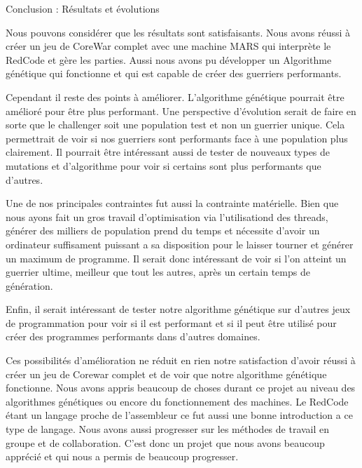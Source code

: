 \documentclass[a4paper, 10pt]{article}
\begin{document}
    \begin{section}{Conclusion : Résultats et évolutions}\label{sec:resultats}
        \par
            Nous pouvons considérer que les résultats sont satisfaisants. Nous avons réussi à créer un jeu de CoreWar complet avec une machine MARS qui interprète le RedCode et gère les parties. Aussi nous avons pu développer un Algorithme génétique qui fonctionne et qui est capable de créer des guerriers performants.
            \medskip
        \par
            Cependant il reste des points à améliorer. L'algorithme génétique pourrait être amélioré pour être plus performant. Une perspective d'évolution serait de faire en sorte que le challenger soit une population test et non un guerrier unique. Cela permettrait de voir si nos guerriers sont performants face à une population plus clairement.
            Il pourrait être intéressant aussi de tester de nouveaux types de mutations et d'algorithme pour voir si certains sont plus performants que d'autres.
            \medskip
        \par
            Une de nos principales contraintes fut aussi la contrainte matérielle. Bien que nous ayons fait un gros travail d'optimisation via l'utilisationd des threads, générer des milliers de population prend du temps et nécessite d'avoir un ordinateur suffisament puissant a sa disposition pour le laisser tourner et générer un maximum de programme. Il serait donc intéressant de voir si l'on atteint un guerrier ultime, meilleur que tout les autres, après un certain temps de génération.
            \medskip
        \par
            Enfin, il serait intéressant de tester notre algorithme génétique sur d'autres jeux de programmation pour voir si il est performant et si il peut être utilisé pour créer des programmes performants dans d'autres domaines.
        \par
            Ces possibilités d'amélioration ne réduit en rien notre satisfaction d'avoir réussi à créer un jeu de Corewar complet et de voir que notre algorithme génétique fonctionne. Nous avons appris beaucoup de choses durant ce projet au niveau des algorithmes génétiques ou encore du fonctionnement des machines. Le RedCode étant un langage proche de l'assembleur ce fut aussi une bonne introduction a ce type de langage. Nous avons aussi progresser sur les méthodes de travail en groupe et de collaboration. C'est donc un projet que nous avons beaucoup apprécié et qui nous a permis de beaucoup progresser.
    \end{section}

    
    
    
\end{document}
